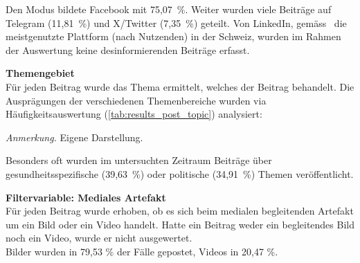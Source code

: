 \documentclass[12pt,a4paper]{article}        %
\begin{document}
Den Modus bildete Facebook mit 75,07 \%. Weiter wurden viele Beiträge auf Telegram (11,81 \%) und X/Twitter (7,35 \%) geteilt. Von LinkedIn, gemäss~\cite{we_are_social_fuhrende_2025}  die meistgenutzte Plattform (nach Nutzenden) in der Schweiz, wurden im Rahmen der Auswertung keine desinformierenden Beiträge erfasst.

\textbf{Themengebiet}\\
Für jeden Beitrag wurde das Thema ermittelt, welches der Beitrag behandelt. Die Ausprägungen der verschiedenen Themenbereiche wurden via Häufigkeitsauswertung (\ref{tab:results_post_topic}) analysiert:

\begin{table}[H]
  \caption{\textit{Relative Häufigkeitsverteilung der Themengebiete der Beiträge in \%.}}
  \label{tab:results_post_topic}
  \centering
\footnotesize\textit{Anmerkung.} Eigene Darstellung.
\end{table}
Besonders oft wurden im untersuchten Zeitraum Beiträge über gesundheitsspezifische (39,63 \%) oder politische (34,91 \%) Themen veröffentlicht.

\textbf{Filtervariable: Mediales Artefakt}\\
Für jeden Beitrag wurde erhoben, ob es sich beim medialen begleitenden Artefakt um ein Bild oder ein Video handelt. Hatte ein Beitrag weder ein begleitendes Bild noch ein Video, wurde er nicht ausgewertet. \\
Bilder wurden in 79,53 \% der Fälle gepostet, Videos in 20,47 \%.
\end{document}
